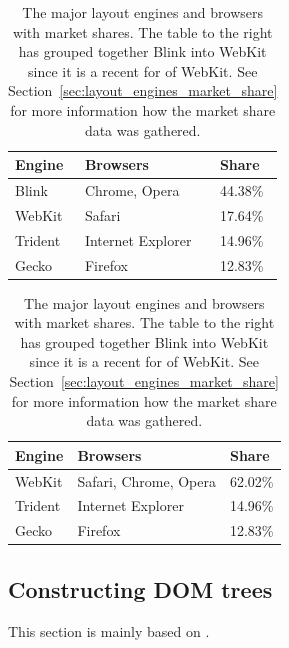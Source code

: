 \documentclass[a4paper,11pt]{kth-mag}
\begin{document}
        \begin{table}[ht]\center
          \tiny
          \begin{minipage}[t]{0.38\linewidth}
            \begin{tabular}[t]{ l l l }
              \textbf{Engine} & \textbf{Browsers} & \textbf{Share} \\
              \hline
              \gls{Blink} & Chrome, Opera & 44.38\% \\
              \gls{WebKit} & Safari & 17.64\% \\
              \gls{Trident} & Internet Explorer & 14.96\% \\
              \gls{Gecko} & Firefox & 12.83\% \\
            \end{tabular}
          \end{minipage}
          \hspace{0.1cm}
          \begin{minipage}[t]{0.42\linewidth}
            \begin{tabular}[t]{ l l l }
              \textbf{Engine} & \textbf{Browsers} & \textbf{Share} \\
              \hline
              \gls{WebKit} & Safari, Chrome, Opera & 62.02\% \\
              \gls{Trident} & Internet Explorer & 14.96\% \\
              \gls{Gecko} & Firefox & 12.83\% \\
            \end{tabular}
          \end{minipage}
          \caption{
            The major \glspl{layout engine} and \glspl{browser} with market shares.
            The table to the right has grouped together \gls{Blink} into \gls{WebKit} since it is a recent for of \gls{WebKit}.
            See Section~\ref{sec:layout_engines_market_share} for more information how the market share data was gathered.}
          \label{table:layout_engines}
        \end{table}


      \subsection{Constructing DOM trees}\label{sec:dom-tree}
        This section is mainly based on .
\end{document}
